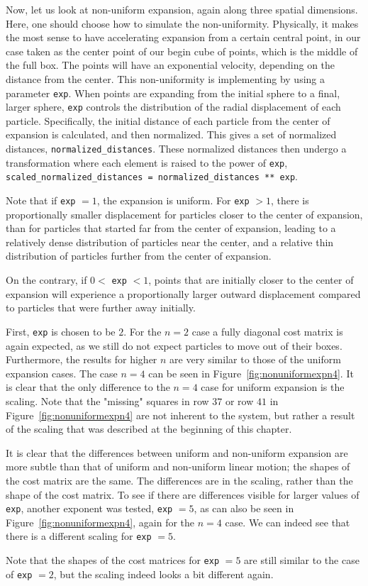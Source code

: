 Now, let us look at non-uniform expansion, again along three spatial dimensions. Here, one should choose how to simulate the non-uniformity. Physically, it makes the most sense to have accelerating expansion from a certain central point, in our case taken as the center point of our begin cube of points, which is the middle of the full box. The points will have an exponential velocity, depending on the distance from the center. This non-uniformity is implementing by using a parameter \lstinline|exp|.  When points are expanding from the initial sphere to a final, larger sphere, \lstinline|exp| controls the distribution of the radial displacement of each particle. Specifically, the initial distance of each particle from the center of expansion is calculated, and then normalized. This gives a set of normalized distances, \lstinline|normalized_distances|. These normalized distances then undergo a transformation where each element is raised to the power of \lstinline|exp|, \lstinline|scaled_normalized_distances = normalized_distances ** exp|. \par  
Note that if \lstinline|exp| $=1$, the expansion is uniform. For \lstinline|exp| $>1$, there is proportionally smaller displacement for particles closer to the center of expansion, than for particles that started far from the center of expansion, leading to a relatively dense distribution of particles near the center, and a relative thin distribution of particles further from the center of expansion. \par 
On the contrary, if $0 < $ \lstinline|exp| $<1$, points that are initially closer to the center of expansion will experience a proportionally larger outward displacement compared to particles that were further away initially. \par 
First, \lstinline|exp| is chosen to be $2$. For the $n=2$ case a fully diagonal cost matrix is again expected, as we still do not expect particles to move out of their boxes. Furthermore, the results for higher $n$ are very similar to those of the uniform expansion cases. The case $n=4$ can be seen in Figure~\ref{fig:nonuniformexpn4}. It is clear that the only difference to the $n=4$ case for uniform expansion is the scaling. Note that the "missing" squares in row $37$ or row $41$ in Figure~\ref{fig:nonuniformexpn4} are not inherent to the system, but rather a result of the scaling that was described at the beginning of this chapter. \par 
It is clear that the differences between uniform and non-uniform expansion are more subtle than that of uniform and non-uniform linear motion; the shapes of the cost matrix are the same. The differences are in the scaling, rather than the shape of the cost matrix. To see if there are differences visible for larger values of \lstinline|exp|, another exponent was tested, \lstinline|exp| $= 5$, as can also be seen in Figure~\ref{fig:nonuniformexpn4}, again for the $n=4$ case. We can indeed see that there is a different scaling for \lstinline|exp| $=5$. \par 
Note that the shapes of the cost matrices for \lstinline|exp| $= 5$ are still similar to the case of \lstinline|exp| $=2$, but the scaling indeed looks a bit different again. 
 

